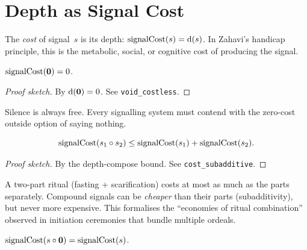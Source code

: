 \section{Depth as Signal Cost}
\label{sec:ch3:cost}

\begin{definition}
\label{def:signal-cost}
The \emph{cost} of signal~$s$ is its depth:
$\operatorname{signalCost}(s) = \operatorname{d}(s)$.
In Zahavi's handicap principle, this is the metabolic, social, or
cognitive cost of producing the signal.
\end{definition}

\begin{theorem}
\label{thm:void-costless}
$\operatorname{signalCost}(\mathbf{0}) = 0$.
\end{theorem}

\begin{proof}[Proof sketch]
By $\operatorname{d}(\mathbf{0}) = 0$.  See \texttt{void\_costless}.
\end{proof}

\begin{remark}
Silence is always free.  Every signalling system must contend with the
zero-cost outside option of saying nothing.
\end{remark}

\begin{theorem}
\label{thm:cost-subadditive}
\[
  \operatorname{signalCost}(s_1 \circ s_2)
  \leq \operatorname{signalCost}(s_1) + \operatorname{signalCost}(s_2).
\]
\end{theorem}

\begin{proof}[Proof sketch]
By the depth-compose bound.  See \texttt{cost\_subadditive}.
\end{proof}

\begin{remark}
A two-part ritual (fasting + scarification) costs at most as much as the
parts separately.  Compound signals can be \emph{cheaper} than their
parts (subadditivity), but never more expensive.  This formalises the
``economies of ritual combination'' observed in initiation ceremonies
that bundle multiple ordeals.
\end{remark}

\begin{theorem}
\label{thm:void-right-compose-cost}
$\operatorname{signalCost}(s \circ \mathbf{0}) = \operatorname{signalCost}(s)$.
\end{theorem}

